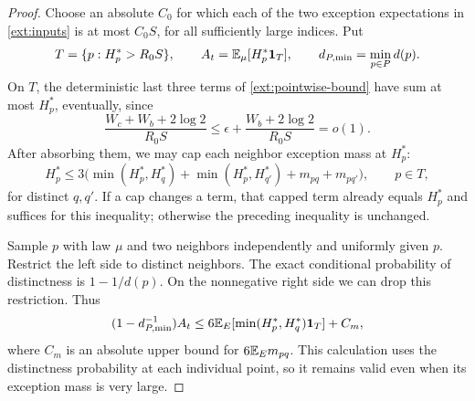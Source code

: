 \begin{proof}
Choose an absolute \(C_0\) for which each of the two exception expectations
in \eqref{ext:inputs} is at most \(C_0S\), for all sufficiently large
indices.  Put
\[
 T=\{p:H_p^*>R_0S\},\qquad
 A_t=\mathbb E_\mu[H_p^*\mathbf1_T],\qquad
 d_{P,\min}=\min_{p\in P}d(p).
\]
On \(T\), the deterministic last three terms of
\eqref{ext:pointwise-bound} have sum at most \(H_p^*\), eventually, since
\[
 \frac{W_c+W_b+2\log2}{R_0S}
 \le\epsilon+\frac{W_b+2\log2}{R_0S}=o(1).
\]
After absorbing them, we may cap each neighbor exception mass at \(H_p^*\):
\begin{equation}\label{ext:capped-pointwise}
 H_p^*\le3\bigl(\min(H_p^*,H_q^*)+\min(H_p^*,H_{q'}^*)
                       +m_{pq}+m_{pq'}\bigr),\qquad p\in T,
\end{equation}
for distinct \(q,q'\).  If a cap changes a term, that capped term already
equals \(H_p^*\) and suffices for this inequality; otherwise the preceding
inequality is unchanged.

Sample \(p\) with law \(\mu\) and two neighbors independently and uniformly
given \(p\).  Restrict the left side to distinct neighbors.  The exact
conditional probability of distinctness is \(1-1/d(p)\).  On the
nonnegative right side we can drop this restriction.  Thus
\begin{equation}\label{ext:tail-average}
 (1-d_{P,\min}^{-1})A_t
 \le 6\mathbb E_E[\min(H_p^*,H_q^*)\mathbf1_T]+C_m,
\end{equation}
where \(C_m\) is an absolute upper bound for \(6\mathbb E_E m_{pq}\).
This calculation uses the distinctness probability at each individual
point, so it remains valid even when its exception mass is very large.


\end{proof}
